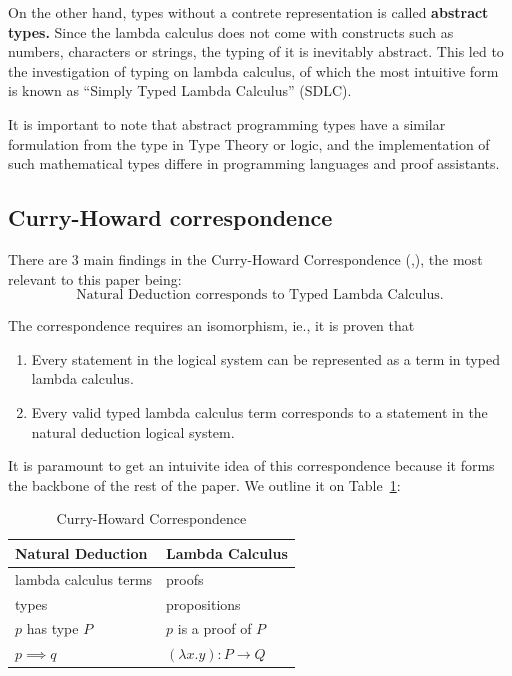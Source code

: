 \documentclass[acmsmall]{acmart}
\begin{document}
On the other hand, types without a contrete representation is called
\textbf{abstract types.} Since the lambda calculus does not come with constructs
such as numbers, characters or strings, the typing of it is inevitably abstract.
This led to the investigation of typing on lambda calculus, of which the most
intuitive form is known as ``Simply Typed Lambda Calculus'' (SDLC).

It is important to note that abstract programming types have a similar
formulation from the type in Type Theory or logic, and the implementation of
such mathematical types differe in programming languages and proof assistants.

\subsection{Curry-Howard correspondence}
There are 3 main findings in the Curry-Howard Correspondence
(\cite{howard1980formulae},\cite{Curry584}), the most relevant to this paper being:
\[\text{Natural Deduction corresponds to Typed Lambda Calculus.}\]

The correspondence requires an isomorphism, ie., it is proven that
\begin{enumerate}
  \item Every statement in the logical system can be represented as a term in
        typed lambda calculus.
  \item Every valid typed lambda calculus term corresponds to a statement in the
        natural deduction logical system.
\end{enumerate}

It is paramount to get an intuivite idea of this correspondence because it forms
the backbone of the rest of the paper. We outline it on Table~\ref{tab:chcorr}:

\begin{table}[H]
  \caption{Curry-Howard Correspondence}\label{tab:chcorr}
  \begin{tabular}{ll}
    \toprule
    Natural Deduction& Lambda Calculus\\
    \midrule
    lambda calculus terms & proofs\\
    types & propositions\\
    $p$ has type $P$ & $p$ is a proof of $P$\\
    $p\implies q$& $(\lambda x.y) : P\to Q$\\
  \bottomrule
\end{tabular}
\end{table}
\end{document}
